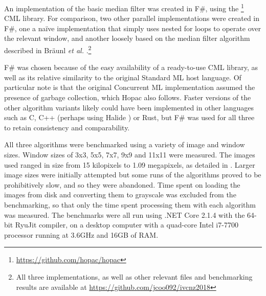 An implementation of the basic median filter was created in F\#, using the \hopac{}\footnote{\url{https://github.com/hopac/hopac}} CML library.  For comparison, two other parallel implementations were created in F\#, one a na\"{i}ve implementation that simply uses nested for loops to operate over the relevant window, and another loosely based on the median filter algorithm described in Br\"{a}unl \textit{et al.} \cite{Braunl2001}.\footnote{All three implementations, as well as other relevant files and benchmarking results are available at \url{https://github.com/jcoo092/ivcnz2018}}

F\# was chosen because of the easy availability of a ready-to-use CML library, as well as its relative similarity to the original Standard ML host language.  Of particular note is that the original Concurrent ML implementation assumed the presence of garbage collection, which Hopac also follows.  Faster versions of the other algorithm variants likely could have been implemented in other languages such as C, C++ (perhaps using Halide \cite{Ragan-Kelley2017}) or Rust, but F\# was used for all three to retain consistency and comparability.  

All three algorithms were benchmarked using a variety of image and window sizes.  Window sizes of 3x3, 5x5, 7x7, 9x9 and 11x11 were measured.  The images used ranged in size from 15 kilopixels to 1.09 megapixels, as detailed in .  Larger image sizes were initially attempted but some runs of the algorithms proved to be prohibitively slow, and so they were abandoned.  Time spent on loading the images from disk and converting them to grayscale was excluded from the benchmarking, so that only the time spent processing them with each algorithm was measured.  The benchmarks were all run using .NET Core 2.1.4 with the 64-bit RyuJit compiler, on a desktop computer with a quad-core Intel i7-7700 processor running at 3.6GHz and 16GB of RAM.

